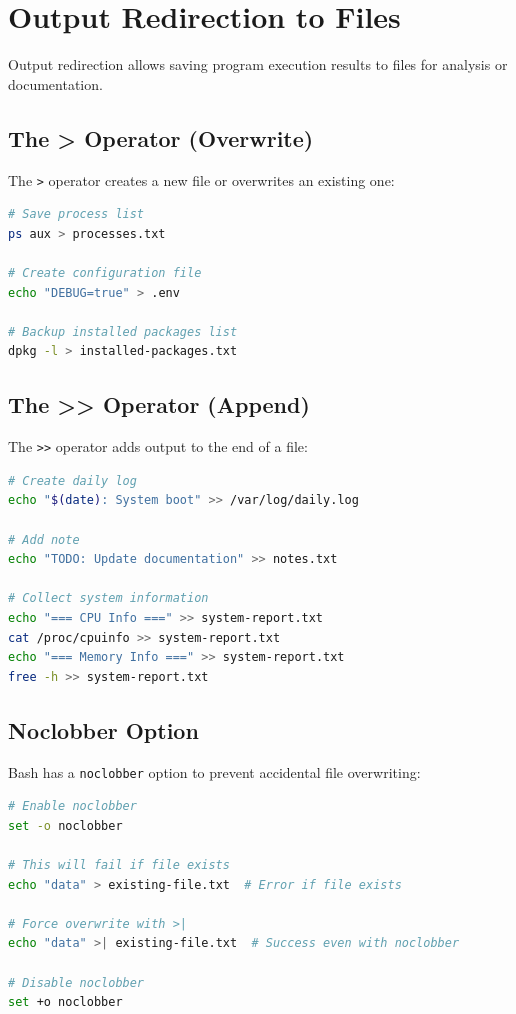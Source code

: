 \section{Output Redirection to Files}
\label{sec:output-redirection}

Output redirection allows saving program execution results to files for analysis or documentation.

\subsection{The > Operator (Overwrite)}

The \texttt{>} operator creates a new file or overwrites an existing one:

\begin{lstlisting}[language=bash, caption={Overwrite with > operator}]
# Save process list
ps aux > processes.txt

# Create configuration file
echo "DEBUG=true" > .env

# Backup installed packages list
dpkg -l > installed-packages.txt
\end{lstlisting}

\subsection{The >> Operator (Append)}

The \texttt{>>} operator adds output to the end of a file:

\begin{lstlisting}[language=bash, caption={Append with >> operator}]
# Create daily log
echo "$(date): System boot" >> /var/log/daily.log

# Add note
echo "TODO: Update documentation" >> notes.txt

# Collect system information
echo "=== CPU Info ===" >> system-report.txt
cat /proc/cpuinfo >> system-report.txt
echo "=== Memory Info ===" >> system-report.txt
free -h >> system-report.txt
\end{lstlisting}

\subsection{Noclobber Option}

Bash has a \texttt{noclobber} option to prevent accidental file overwriting:

\begin{lstlisting}[language=bash, caption={Using noclobber}]
# Enable noclobber
set -o noclobber

# This will fail if file exists
echo "data" > existing-file.txt  # Error if file exists

# Force overwrite with >|
echo "data" >| existing-file.txt  # Success even with noclobber

# Disable noclobber
set +o noclobber
\end{lstlisting}

